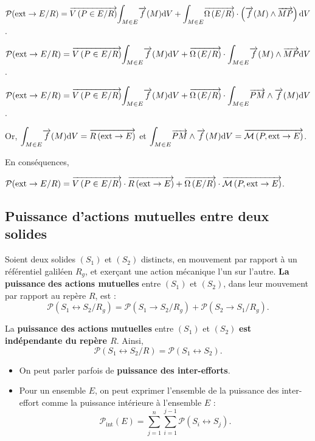\documentclass[10pt,fleqn]{article} %
\begin{document}
$ \mathcal{P}(\text{ext} \rightarrow E/R)
=  \overrightarrow{V\left( {P} \in {E}/{R}\right)} \displaystyle{\int_{M\in E}}\overrightarrow{f}(M)  \text{d} V
+\displaystyle{\int_{M\in E}}\overrightarrow{\Omega\left( {E}/{R}\right)}\cdot \left( \overrightarrow{f}(M)\wedge  \overrightarrow{MP} \right) \text{d} V $.

$ \mathcal{P}(\text{ext} \rightarrow E/R)
=  \overrightarrow{V\left( {P} \in {E}/{R}\right)} \displaystyle{\int_{M\in E}}\overrightarrow{f}(M)  \text{d} V
+\overrightarrow{\Omega\left( {E}/{R}\right)}\cdot \displaystyle{\int_{M\in E}}  \overrightarrow{f}(M)\wedge  \overrightarrow{MP}  \text{d} V $.

$ \mathcal{P}(\text{ext} \rightarrow E/R)
=  \overrightarrow{V\left( {P} \in {E}/{R}\right)} \displaystyle{\int_{M\in E}}\overrightarrow{f}(M)  \text{d} V
+\overrightarrow{\Omega\left( {E}/{R}\right)}\cdot \displaystyle{\int_{M\in E}}  \overrightarrow{PM}\wedge \overrightarrow{f}(M)   \text{d} V $.


Or, $\displaystyle{\int_{M\in E}}\overrightarrow{f}(M)  \text{d} V = \overrightarrow{R\left( {\text{ext}} \rightarrow {E}\right)}$ et 
$ \displaystyle{\int_{M\in E}}  \overrightarrow{PM}\wedge \overrightarrow{f}(M)   \text{d} V = \overrightarrow{\mathcal{M}\left( {P}, {\text{ext}} \rightarrow {E}\right)}$.

En conséquences, 

$ \mathcal{P}(\text{ext} \rightarrow E/R)
=  \overrightarrow{V\left( {P} \in {E}/{R}\right)}\cdot \overrightarrow{R\left( {\text{ext}} \rightarrow {E}\right)} +\overrightarrow{\Omega\left( {E}/{R}\right)}\cdot  \overrightarrow{\mathcal{M}\left( {P}, {\text{ext}} \rightarrow {E}\right)} $.


\subsection{Puissance d'actions mutuelles entre deux solides}


\begin{defi}
Soient deux solides $(S_1)$ et $(S_2)$ distincts, en mouvement par rapport à un référentiel galiléen $R_g$, et exerçant une action mécanique l'un sur l'autre.
\textbf{La puissance} \textbf{des actions mutuelles} entre $(S_1)$ et $(S_2)$, dans leur mouvement par rapport au repère $R$, est :
$$
\mathcal{P}(S_1 \leftrightarrow S_2/R_g)=\mathcal{P}(S_1 \rightarrow S_2/R_g)+\mathcal{P}(S_2 \rightarrow S_1/R_g).
$$		
 

La \textbf{puissance des actions mutuelles} entre $(S_1)$ et $(S_2)$ \textbf{est indépendante du repère $R$}.
Ainsi,
$$\mathcal{P}(S_1 \leftrightarrow S_2/R)=\mathcal{P}(S_1 \leftrightarrow S_2).
$$
\end{defi}


\begin{rem}%
\begin{itemize}
\item On peut parler parfois de \textbf{puissance des inter-efforts}.
\item Pour un ensemble $E$, on peut exprimer l'ensemble de la puissance des inter-effort comme la puissance intérieure à l'ensemble $E$ : 
$$
\mathcal{P}_{\text{int}}(E)=\displaystyle{\sum^n_{j=1}}\displaystyle{\sum^{j-1}_{i=1}}\mathcal{P}(S_i \leftrightarrow S_j).
$$
\end{itemize}

\end{rem}%
\end{document}
